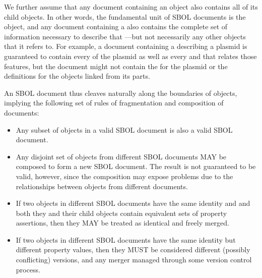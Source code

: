 We further assume that any document containing an object also contains all of its child objects.
In other words, the fundamental unit of SBOL documents is the  object, and any document containing a  also contains the complete set of information necessary to describe that ---but not necessarily any other  objects that it refers to.
For example, a document containing a  describing a plasmid is guaranteed to contain every  of the plasmid as well as every  and  that relates those features, but the document might not contain the  for the plasmid or the definitions for the  objects linked from its  parts.

An SBOL document thus cleaves naturally along the boundaries of  objects, implying the following set of rules of fragmentation and composition of documents:
\begin{itemize}
\item Any subset of  objects in a valid SBOL document is also a valid SBOL document.
\item Any disjoint set of  objects from different SBOL documents MAY be composed to form a new SBOL document. The result is not guaranteed to be valid, however, since the composition may expose problems due to the relationships between  objects from different documents.
\item If two  objects in different SBOL documents have the same identity and and both they and their child objects contain equivalent sets of property assertions, then they MAY be treated as identical and freely merged.
\item  If two  objects in different SBOL documents have the same identity but different property values, then they MUST be considered different (possibly conflicting) versions, and any merger managed through some version control process.
\end{itemize}
